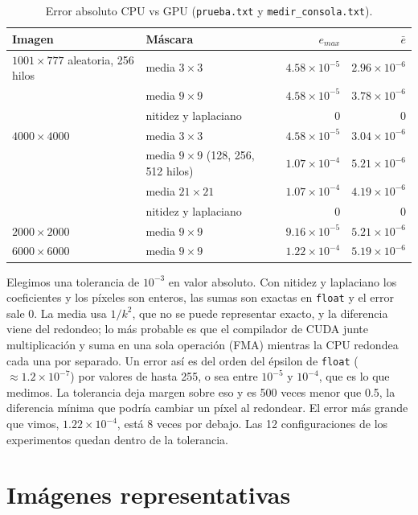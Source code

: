\documentclass[12pt]{article}
\begin{document}
\begin{table}[H]
\centering
\caption{Error absoluto CPU vs GPU (\texttt{prueba.txt} y \texttt{medir\_consola.txt}).}
\begin{tabular}{llrr}
\toprule
Imagen & Máscara & $e_{max}$ & $\bar e$ \\
\midrule
$1001\times777$ aleatoria, 256 hilos & media $3\times3$ & $4.58\times10^{-5}$ & $2.96\times10^{-6}$ \\
 & media $9\times9$ & $4.58\times10^{-5}$ & $3.78\times10^{-6}$ \\
 & nitidez y laplaciano & 0 & 0 \\
\midrule
$4000\times4000$ & media $3\times3$ & $4.58\times10^{-5}$ & $3.04\times10^{-6}$ \\
 & media $9\times9$ (128, 256, 512 hilos) & $1.07\times10^{-4}$ & $5.21\times10^{-6}$ \\
 & media $21\times21$ & $1.07\times10^{-4}$ & $4.19\times10^{-6}$ \\
 & nitidez y laplaciano & 0 & 0 \\
$2000\times2000$ & media $9\times9$ & $9.16\times10^{-5}$ & $5.21\times10^{-6}$ \\
$6000\times6000$ & media $9\times9$ & $1.22\times10^{-4}$ & $5.19\times10^{-6}$ \\
\bottomrule
\end{tabular}
\end{table}

Elegimos una tolerancia de $10^{-3}$ en valor absoluto. Con nitidez y laplaciano los
coeficientes y los píxeles son enteros, las sumas son exactas en \texttt{float} y el error sale
0. La media usa $1/k^2$, que no se puede representar exacto, y la diferencia viene del
redondeo; lo más probable es que el compilador de CUDA junte multiplicación y suma en una sola
operación (FMA) mientras la CPU redondea cada una por separado. Un error así es del orden del
épsilon de \texttt{float} ($\approx1.2\times10^{-7}$) por valores de hasta 255, o sea entre
$10^{-5}$ y $10^{-4}$, que es lo que medimos. La tolerancia deja margen sobre eso y es 500
veces menor que 0.5, la diferencia mínima que podría cambiar un píxel al redondear. El error
más grande que vimos, $1.22\times10^{-4}$, está 8 veces por debajo. Las 12 configuraciones de
los experimentos quedan dentro de la tolerancia.

\section{Imágenes representativas}\label{sec:imagenes}
\end{document}
